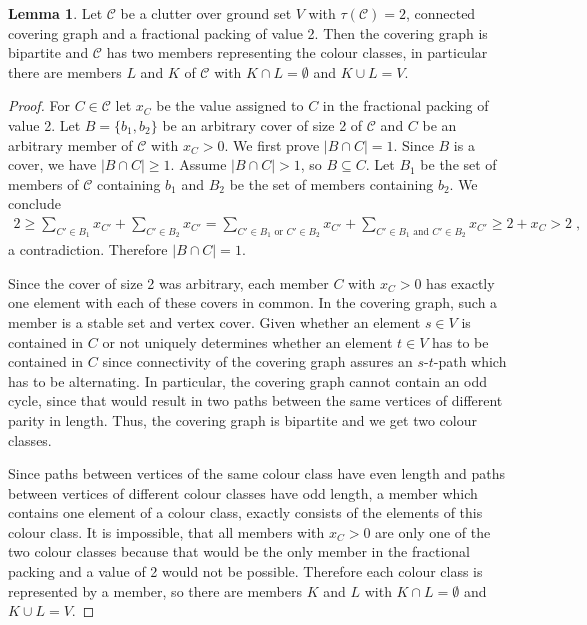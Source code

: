 \documentclass[a4paper, 12pt]{scrbook}
\theoremstyle{definition}
\newtheorem{lemma}[theorem]{Lemma}
\begin{document}
   \begin{lemma}\label{bipartite}
       Let $\mathcal{C}$ be a clutter over ground set $V$ with $\tau(\mathcal{C})=2$, connected covering graph and a fractional packing of value 2.
       Then the covering graph is bipartite and $\mathcal{C}$ has two members representing the colour classes, in particular there are members $L$ and $K$ of $\mathcal{C}$ with $K \cap L = \emptyset$ and $K \cup L = V$.
   \end{lemma}

   \begin{proof}
       For $C \in \mathcal{C}$ let $x_C$ be the value assigned to $C$ in the fractional packing of value 2.
       Let $B=\{b_1,b_2\}$ be an arbitrary cover of size 2 of $\mathcal{C}$ and $C$ be an arbitrary member of $\mathcal{C}$ with $x_{C} > 0$.
       We first prove $|B\cap C| = 1$.
       Since $B$ is a cover, we have $|B\cap C| \geq 1$.
       Assume $|B \cap C| > 1$, so $B \subseteq C$.
       Let $B_1$ be the set of members of $\mathcal{C}$ containing $b_1$ and $B_2$ be the set of members containing $b_2$.
       We conclude
       \begin{align*}
           2 \geq \sum_{C'\in B_1} x_{C'} + \sum_{C' \in B_2} x_{C'} = \sum_{C' \in B_1 \text{ or } C' \in B_2} x_{C'} + \sum_{C' \in B_1 \text{ and } C' \in B_2} x_{C'} \geq 2 + x_C > 2 \;,
       \end{align*}
       a contradiction. Therefore $|B\cap C| = 1$.

       Since the cover of size 2 was arbitrary, each member $C$ with $x_C>0$ has exactly one element with each of these covers in common.
       In the covering graph, such a member is a stable set and vertex cover.
       Given whether an element $s \in V$ is contained in $C$ or not uniquely determines whether an element $t \in V$ has to be contained in $C$ since connectivity of the covering graph assures an $s$-$t$-path which has to be alternating.
       In particular, the covering graph cannot contain an odd cycle, since that would result in two paths between the same vertices of different parity in length. Thus, the covering graph is bipartite and we get two colour classes.

       Since paths between vertices of the same colour class have even length and paths between vertices of different colour classes have odd length, a member which contains one element of a colour class, exactly consists of the elements of this colour class.
       It is impossible, that all members with $x_C > 0$ are only one of the two colour classes because that would be the only member in the fractional packing and a value of 2 would not be possible.
       Therefore each colour class is represented by a member, so there are members $K$ and $L$ with $K \cap L = \emptyset$ and $K \cup L = V$.
   \end{proof}
\end{document}
